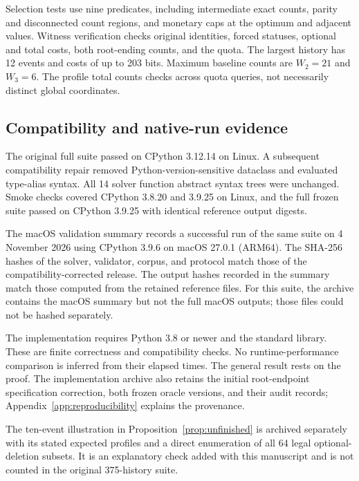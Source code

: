 Selection tests use nine predicates, including intermediate exact counts,
parity and disconnected count regions, and monetary caps at the optimum and
adjacent values. Witness verification checks original identities, forced
statuses, optional and total costs, both root-ending counts, and the quota.
The largest history has 12 events and costs of up to 203 bits. Maximum
baseline counts are $W_2=21$ and $W_3=6$. The profile total counts checks
across quota queries, not necessarily distinct global coordinates.

\subsection{Compatibility and native-run evidence}

The original full suite passed on CPython 3.12.14 on Linux. A subsequent
compatibility repair removed Python-version-sensitive dataclass and evaluated
type-alias syntax. All 14 solver function abstract syntax trees were unchanged.
Smoke checks covered CPython 3.8.20 and 3.9.25 on Linux, and the full frozen
suite passed on CPython 3.9.25 with identical reference output digests.

The macOS validation summary records a successful run of the same suite on
4 November 2026 using CPython 3.9.6 on macOS 27.0.1 (ARM64).
The SHA-256 hashes of the solver, validator, corpus, and protocol match
those of the compatibility-corrected release. The output hashes recorded
in the summary match those computed from the retained reference files.
For this suite, the archive contains the macOS summary but not the
full macOS outputs; those files could not be hashed separately.

The implementation requires Python 3.8 or newer and the standard library.
These are finite correctness and compatibility checks. No runtime-performance
comparison is inferred from their elapsed times. The general result rests
on the proof. The implementation archive also retains the initial root-endpoint
specification correction, both frozen oracle versions, and their audit
records; Appendix~\ref{app:reproducibility} explains the provenance.

The ten-event illustration in Proposition~\ref{prop:unfinished} is archived
separately with its stated expected profiles and a direct enumeration of all
64 legal optional-deletion subsets. It is an explanatory check added with
this manuscript and is not counted in the original 375-history suite.
